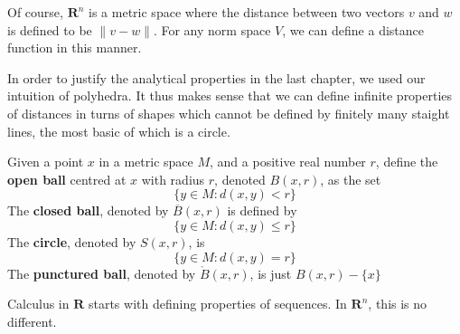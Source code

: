 Of course, $\mathbf{R}^n$ is a metric space where the distance between two vectors $v$ and $w$ is defined to be $\|v - w\|$. For any norm space $V$, we can define a distance function in this manner.

In order to justify the analytical properties in the last chapter, we used our intuition of polyhedra. It thus makes sense that we can define infinite properties of distances in turns of shapes which cannot be defined by finitely many staight lines, the most basic of which is a circle.

\begin{definition}
  Given a point $x$ in a metric space $M$, and a positive real number $r$, define the {\bf open ball} centred at $x$ with radius $r$, denoted $B(x,r)$, as the set
  \[ \{ y \in M : d(x,y) < r \} \]
  The {\bf closed ball}, denoted by $\overline{B}(x,r)$ is defined by
  \[ \{ y \in M : d(x,y) \leq r \} \]
  The {\bf circle}, denoted by $S(x,r)$, is
  \[ \{ y \in M : d(x,y) = r \} \]
  The {\bf punctured ball}, denoted by $\mathring{B}(x,r)$, is just $B(x,r) - \{x\}$
\end{definition}

Calculus in $\mathbf{R}$ starts with defining properties of sequences. In $\mathbf{R}^n$, this is no different.

